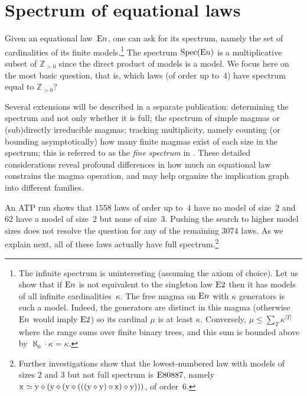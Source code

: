 \section{Spectrum of equational laws}\label{spectrum-sec}

Given an equational law~$\mathrm{E}n$, one can ask for its spectrum, namely the set of cardinalities of its finite models.\footnote{The infinite spectrum is uninteresting (assuming the axiom of choice).  Let us show that if $\mathrm{E}n$ is not equivalent to the singleton law $\mathrm{E}2$ then it has models of all infinite cardinalities~$\kappa$.  The free magma on $\mathrm{E}n$ with $\kappa$ generators is such a model.  Indeed, the generators are distinct in this magma (otherwise $\mathrm{E}n$ would imply $\mathrm{E}2$) so its cardinal $\mu$ is at least $\kappa$.  Conversely, $\mu\leq\sum_T\kappa^{|T|}$ where the range sums over finite binary trees, and this sum is bounded above by $\aleph_0\cdot\kappa=\kappa$.}
The spectrum $\operatorname{Spec}(\mathrm{E}n)$ is a multiplicative subset of $\mathbb{Z}_{>0}$ since the direct product of models is a model.
We focus here on the most basic question, that is, which laws (of order up to~$4$) have spectrum equal to $\mathbb{Z}_{>0}$?

Several extensions will be described in a separate publication: determining the spectrum and not only whether it is full; the spectrum of simple magmas or (sub)directly irreducible magmas; tracking multiplicity, namely counting (or bounding asymptotically) how many finite magmas exist of each size in the spectrum; this is referred to as the \emph{fine spectrum} in \cite{taylor}.  These detailed considerations reveal profound differences in how much an equational law constrains the magma operation, and may help organize the implication graph into different families.

An ATP run shows that $\num{1558}$ laws of order up to~$4$ have no model of size~$2$ and $\num{62}$ have a model of size~$2$ but none of size~$3$.  Pushing the search to higher model sizes does not resolve the question for any of the remaining $\num{3074}$ laws.  As we explain next, all of these laws actually have full spectrum.\footnote{Further investigations show that the lowest-numbered law with models of sizes $2$ and $3$ but not full spectrum is $\mathrm{E}80887$, namely $\mathrm{x} \simeq \mathrm{y} \diamond (\mathrm{y} \diamond (\mathrm{y} \diamond (((\mathrm{y} \diamond \mathrm{y}) \diamond \mathrm{x}) \diamond \mathrm{y})))$, of order~$6$.}


